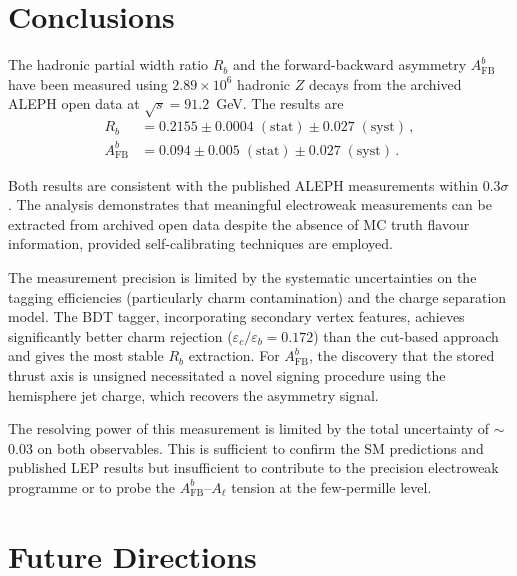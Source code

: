 \documentclass[11pt,a4paper]{article}
\begin{document}
\section{Conclusions}
\label{sec:conclusions}

The hadronic partial width ratio $R_b$ and the forward-backward
asymmetry $A_\mathrm{FB}^b$ have been measured using $2.89 \times 10^6$
hadronic $Z$ decays from the archived ALEPH open data at
$\sqrt{s} = 91.2$~GeV.  The results are
\begin{align*}
  R_b &= 0.2155 \pm 0.0004\;\mathrm{(stat)} \pm 0.027\;\mathrm{(syst)}\,,\\
  A_\mathrm{FB}^b &= 0.094 \pm 0.005\;\mathrm{(stat)} \pm 0.027\;\mathrm{(syst)}\,.
\end{align*}

Both results are consistent with the published ALEPH measurements within
$0.3\sigma$.  The analysis demonstrates that meaningful electroweak
measurements can be extracted from archived open data despite the absence
of MC truth flavour information, provided self-calibrating techniques are
employed.

The measurement precision is limited by the systematic uncertainties on
the tagging efficiencies (particularly charm contamination) and the charge
separation model.  The BDT tagger, incorporating secondary vertex features,
achieves significantly better charm rejection ($\varepsilon_c/\varepsilon_b
= 0.172$) than the cut-based approach and gives the most stable $R_b$
extraction.  For $A_\mathrm{FB}^b$, the discovery that the stored thrust
axis is unsigned necessitated a novel signing procedure using the
hemisphere jet charge, which recovers the asymmetry signal.

The resolving power of this measurement is limited by the total uncertainty
of $\sim$0.03 on both observables.  This is sufficient to confirm the
SM predictions and published LEP results but insufficient to contribute
to the precision electroweak programme or to probe the
$A_\mathrm{FB}^b$--$A_\ell$ tension at the few-permille level.

\section{Future Directions}
\label{sec:future}
\end{document}
